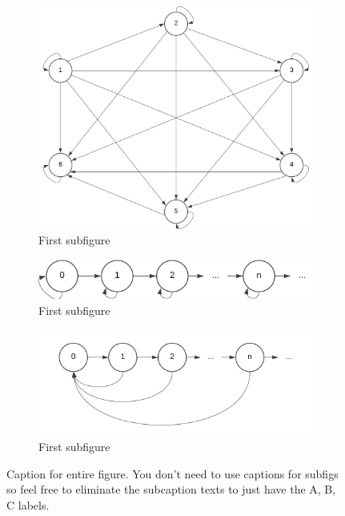 \documentclass[11pt]{amsart}
\begin{document}
\begin{figure}
    \centering
    \begin{subfigure}[b]{.3\textwidth}
    \includegraphics[width=\textwidth]{./Figs/fig1.png}
    \caption{First subfigure}
    \label{subfig:first}
    \end{subfigure}
    \begin{subfigure}[b]{.3\textwidth}
    \includegraphics[width=\textwidth]{./Figs/fig2.png}
    \caption{First subfigure}
    \label{subfig:second}
    \end{subfigure}
    \begin{subfigure}[b]{.3\textwidth}
    \includegraphics[width=\textwidth]{./Figs/fig3.png}
    \caption{First subfigure}
    \label{subfig:third}
    \end{subfigure}
    \caption{Caption for entire figure. You don't need to use captions for subfigs so 
    feel free to eliminate the subcaption texts to just have the A, B, C labels.}
    \label{fig:meaningful-label-2}
\end{figure}
\end{document}
